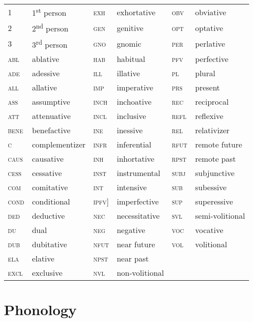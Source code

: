 \documentclass[11pt,a4paper,titlepage]{article}
\begin{document}
		\begin{tabular}{l l l l l l}
			1 & 1\textsuperscript{st} person & \textsc{exh} & exhortative & \textsc{obv} & obviative \\
			2 & 2\textsuperscript{nd} person & \textsc{gen} & genitive & \textsc{opt} & optative \\
			3 & 3\textsuperscript{rd} person & \textsc{gno} & gnomic & \textsc{per} & perlative \\
			\textsc{abl} & ablative & \textsc{hab} & habitual & \textsc{pfv} & perfective \\
			\textsc{ade} & adessive & \textsc{ill} & illative & \textsc{pl} & plural \\
			\textsc{all} & allative & \textsc{imp} & imperative & \textsc{prs} & present \\
			\textsc{ass} & assumptive & \textsc{inch} & inchoative & \textsc{rec} & reciprocal \\
			\textsc{att} & attenuative & \textsc{incl} & inclusive & \textsc{refl} & reflexive \\
			\textsc{bene} & benefactive & \textsc{ine} & inessive & \textsc{rel} & relativizer \\
			\textsc{c} & complementizer & \textsc{infr} & inferential & \textsc{rfut} & remote future \\
			\textsc{caus} & causative & \textsc{inh} & inhortative & \textsc{rpst} & remote past \\
			\textsc{cess} & cessative & \textsc{inst} & instrumental & \textsc{subj} & subjunctive \\
			\textsc{com} & comitative & \textsc{int} & intensive & \textsc{sub} & subessive \\
			\textsc{cond} & conditional & \textsc{ipfv]} & imperfective & \textsc{sup} & superessive \\
			\textsc{ded} & deductive & \textsc{nec} & necessitative & \textsc{svl} & semi-volitional \\
			\textsc{du} & dual & \textsc{neg} & negative & \textsc{voc} & vocative \\
			\textsc{dub} & dubitative & \textsc{nfut} & near future & \textsc{vol} & volitional \\
			\textsc{ela} & elative & \textsc{npst} & near past & & \\
			\textsc{excl} & exclusive & \textsc{nvl} & non-volitional & & \\
		\end{tabular}
	
	\section{Phonology}
									
\end{document}

